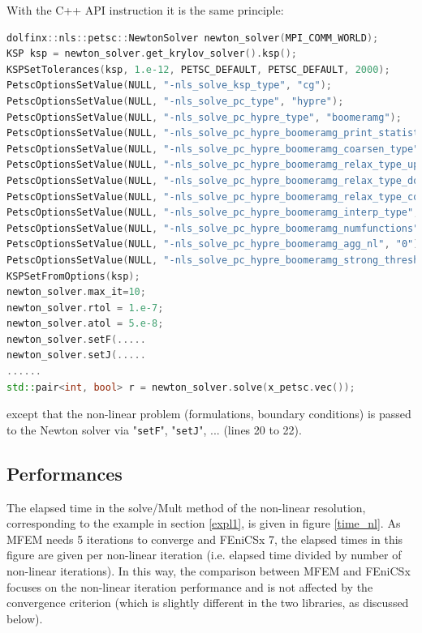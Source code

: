 \documentclass[12pt]{article}
\newcommand{\f}[1]{FEniCSx#1}
\newcommand{\mycode}[1]{\textsf{"}\lstinline`#1`\textsf{"}}
\begin{document}
With the C++ API instruction it is the same principle:
\begin{lstlisting}[basicstyle=\footnotesize,language=c++]
dolfinx::nls::petsc::NewtonSolver newton_solver(MPI_COMM_WORLD);
KSP ksp = newton_solver.get_krylov_solver().ksp();
KSPSetTolerances(ksp, 1.e-12, PETSC_DEFAULT, PETSC_DEFAULT, 2000);
PetscOptionsSetValue(NULL, "-nls_solve_ksp_type", "cg");
PetscOptionsSetValue(NULL, "-nls_solve_pc_type", "hypre");
PetscOptionsSetValue(NULL, "-nls_solve_pc_hypre_type", "boomeramg");
PetscOptionsSetValue(NULL, "-nls_solve_pc_hypre_boomeramg_print_statistics", "1");
PetscOptionsSetValue(NULL, "-nls_solve_pc_hypre_boomeramg_coarsen_type", "HMIS");
PetscOptionsSetValue(NULL, "-nls_solve_pc_hypre_boomeramg_relax_type_up", "l1scaled-SOR/Jacobi");  
PetscOptionsSetValue(NULL, "-nls_solve_pc_hypre_boomeramg_relax_type_down", "l1scaled-SOR/Jacobi");
PetscOptionsSetValue(NULL, "-nls_solve_pc_hypre_boomeramg_relax_type_coarse", "Gaussian-elimination");
PetscOptionsSetValue(NULL, "-nls_solve_pc_hypre_boomeramg_interp_type", "ext+i");
PetscOptionsSetValue(NULL, "-nls_solve_pc_hypre_boomeramg_numfunctions", "2");
PetscOptionsSetValue(NULL, "-nls_solve_pc_hypre_boomeramg_agg_nl", "0");
PetscOptionsSetValue(NULL, "-nls_solve_pc_hypre_boomeramg_strong_threshold", "0.25");
KSPSetFromOptions(ksp);
newton_solver.max_it=10;
newton_solver.rtol = 1.e-7;
newton_solver.atol = 5.e-8;
newton_solver.setF(.....
newton_solver.setJ(.....
......
std::pair<int, bool> r = newton_solver.solve(x_petsc.vec());
\end{lstlisting}
except that the non-linear problem (formulations, boundary conditions) is passed to the Newton solver via \mycode{setF}, \mycode{setJ}, ... (lines 20 to 22). 	

\subsection{Performances\label{solv_perf}}
The elapsed time in the solve/Mult method of the non-linear resolution, corresponding to the example in section \ref{expl1}, is given in figure \ref{time_nl}.
As MFEM needs 5 iterations to converge and \f{} 7, the elapsed times in this figure are given per non-linear iteration (i.e. elapsed time divided by number of non-linear iterations).
In this way, the comparison between MFEM and \f{} focuses on the non-linear iteration performance and is not affected by the convergence criterion (which is slightly different in the two libraries, as discussed below).
\end{document}
